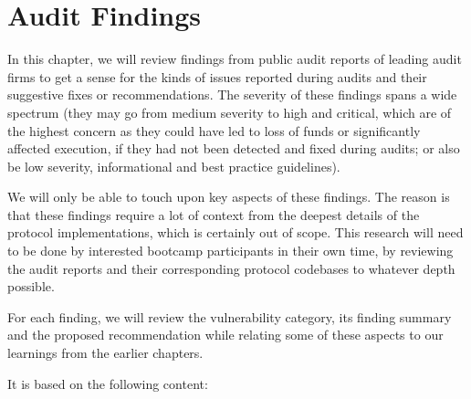 \chapter{Audit Findings}\label{audit-findings}

In this chapter, we will review findings from public audit reports of
leading audit firms to get a sense for the kinds of issues reported
during audits and their suggestive fixes or recommendations. The
severity of these findings spans a wide spectrum (they may go from
medium severity to high and critical, which are of the highest concern
as they could have led to loss of funds or significantly affected
execution, if they had not been detected and fixed during audits; or
also be low severity, informational and best practice guidelines).

We will only be able to touch upon key aspects of these findings. The
reason is that these findings require a lot of context from the deepest
details of the protocol implementations, which is certainly out of
scope. This research will need to be done by interested bootcamp
participants in their own time, by reviewing the audit reports and their
corresponding protocol codebases to whatever depth possible.

For each finding, we will review the vulnerability category, its finding
summary and the proposed recommendation while relating some of these
aspects to our learnings from the earlier chapters.

It is based on the following content:


